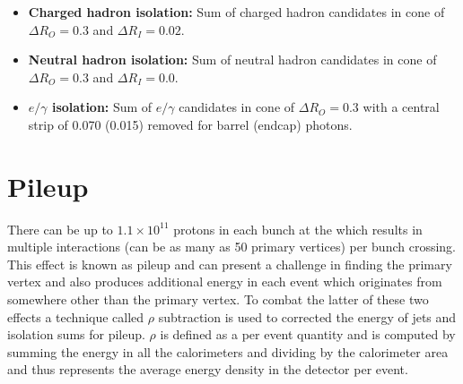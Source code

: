 \begin{itemize}
  \item{\textbf{Charged hadron isolation:} Sum of charged hadron \PF candidates \ET in cone of $\Delta R_{O}=0.3$ and $\Delta R_{I}=0.02$.} 
  \item{\textbf{Neutral hadron isolation:} Sum of neutral hadron \PF candidates \ET in cone of $\Delta R_{O}=0.3$ and $\Delta R_{I}=0.0$.}
  \item{\textbf{$e/\gamma$ isolation:} Sum of $e/\gamma$ \PF candidates \ET in cone of $\Delta R_{O}=0.3$ with a central \eta strip of 0.070 (0.015) removed for barrel (endcap) photons.}
\end{itemize}

\section{Pileup}
\label{sec:pileup}

There can be up to $1.1\times10^{11}$ protons in each bunch at the \LHC which results in multiple interactions (can be as many as 50 primary vertices) per bunch crossing. This effect is known as pileup and can present a challenge in finding the primary vertex and also produces additional energy in each event which originates from somewhere other than the primary vertex. To combat the latter of these two effects a technique called $\rho$ subtraction is used to corrected the energy of jets and isolation sums for pileup. $\rho$ is defined as a per event quantity and is computed by summing the energy in all the calorimeters and dividing by the calorimeter area and thus represents the average energy density in the detector per event.




